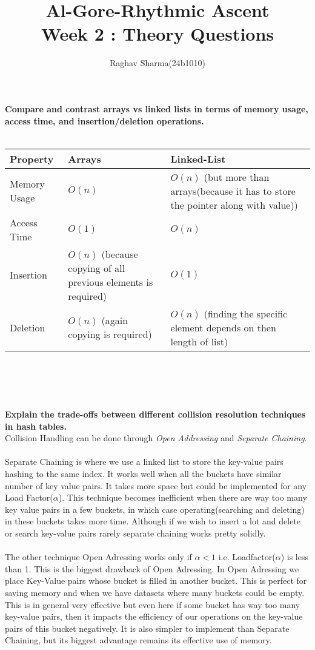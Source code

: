 \documentclass{article}
\begin{document}
\title{Al-Gore-Rhythmic Ascent\\Week 2 : Theory Questions}
\author{Raghav Sharma(24b1010)}
\maketitle
\newpage
\noindent \textbf{Compare and contrast arrays vs linked lists in terms of memory usage, access time, and insertion/deletion operations.}\\ \\
\begin{tabular}{|p{2.5cm}|p{5cm}|p{5cm}|}
    \hline
Property & Arrays & Linked-List \\
\hline
Memory Usage & $O(n)$ & $O(n)$ (but more than arrays(because it has to store the pointer along with value)) \\ \hline
Access Time & $O(1)$ & $O(n)$ \\ \hline
Insertion & $O(n)$ (because copying of all previous elements is required) & $O(1)$ \\ \hline
Deletion & $O(n)$ (again copying is required) & $O(n)$ (finding the specific element depends on then length of list)\\ \hline
\end{tabular}
\\ \\ \\ \\
\textbf{Explain the trade-offs between different collision resolution techniques in hash tables.}
\\
Collision Handling can be done through \emph{Open Addressing} and \emph{Separate Chaining}. \\ \\
Separate Chaining is where we use a linked list to store the key-value pairs hashing to the same index. It works well when all the buckets have similar number of key value pairs. It takes more space but could be implemented for any Load Factor($\alpha$). This technique becomes inefficient when there are way too many key value pairs in a few buckets, in which case operating(searching and deleting) in these buckets takes more time. Although if we wish to insert a lot and delete or search key-value pairs rarely separate chaining works pretty solidly.\\ \\
The other technique Open Adressing works only if $\alpha < 1$ i.e. Loadfactor($\alpha$) is less than 1. This is the biggest drawback of Open Adressing. In Open Adressing we place Key-Value pairs whose bucket is filled in another bucket. This is perfect for saving memory and when we have datasets where many buckets could be empty. This is in general very effective but even here if some bucket has way too many key-value pairs, then it impacts the efficiency of our operations on the key-value pairs of this bucket negatively. It is also simpler to implement than Separate Chaining, but its biggest advantage remains its effective use of memory.\\ \\ \\ \\
\end{document}
